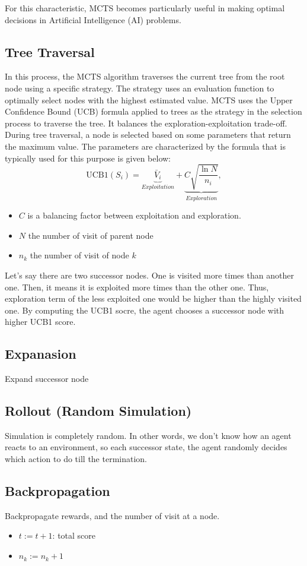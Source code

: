 For this characteristic, MCTS becomes particularly useful in making optimal decisions in Artificial Intelligence (AI) problems.

\subsection{Tree Traversal}
In this process, the MCTS algorithm traverses the current tree from the root node using a specific strategy. The strategy uses an evaluation function to optimally select nodes with the highest estimated value. MCTS uses the Upper Confidence Bound (UCB) formula applied to trees as the strategy in the selection process to traverse the tree. It balances the exploration-exploitation trade-off. During tree traversal, a node is selected based on some parameters that return the maximum value. The parameters are characterized by the formula that is typically used for this purpose is given below:
$$\textrm{UCB1}(S_i) = \underbrace{\bar{V}_i}_{Exploitation} + \underbrace{C \sqrt{\frac{\ln N}{n_i}}}_{Exploration}, $$
\begin{itemize}
	\item $C$ is a balancing factor between exploitation and exploration.
	\item $N$ the number of visit of parent node
	\item $n_k$ the number of visit of node $k$
\end{itemize}
Let's say there are two successor nodes. One is visited more times than another one. Then, it means it is exploited more times than the other one. Thus, exploration term of the less exploited one would be higher than the highly visited one. By computing the UCB1 socre, the agent chooses a successor node with higher UCB1 score.
\subsection{Expanasion}
Expand successor node
\subsection{Rollout (Random Simulation)}
Simulation is completely random. In other words, we don't know how an agent reacts to an environment, so each successor state, the agent randomly decides which action to do till the termination. 
\subsection{Backpropagation}
Backpropagate rewards, and the number of visit at a node. 
\begin{itemize}
	\item $t := t+1$: total score
	\item $n_k := n_k+1$
\end{itemize}

